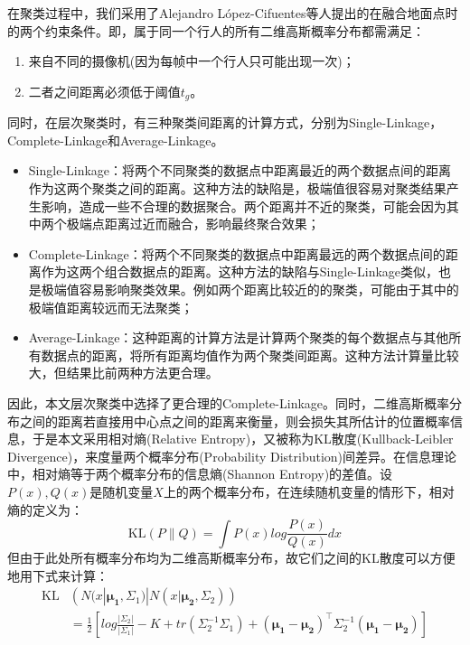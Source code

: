 在聚类过程中，我们采用了Alejandro López-Cifuentes\cite{A2018Semantic}等人提出的在融合地面点时的两个约束条件。即，属于同一个行人的所有二维高斯概率分布都需满足：
\begin{enumerate}
    \item 来自不同的摄像机(因为每帧中一个行人只可能出现一次)；
    \item 二者之间距离必须低于阈值$t_{g}$。
\end{enumerate}
同时，在层次聚类时，有三种聚类间距离的计算方式，分别为Single-Linkage，Complete-Linkage和Average-Linkage。
\begin{itemize}
    \item Single-Linkage：将两个不同聚类的数据点中距离最近的两个数据点间的距离作为这两个聚类之间的距离。这种方法的缺陷是，极端值很容易对聚类结果产生影响，造成一些不合理的数据聚合。两个距离并不近的聚类，可能会因为其中两个极端点距离过近而融合，影响最终聚合效果；
    \item Complete-Linkage：将两个不同聚类的数据点中距离最远的两个数据点间的距离作为这两个组合数据点的距离。这种方法的缺陷与Single-Linkage类似，也是极端值容易影响聚类效果。例如两个距离比较近的的聚类，可能由于其中的极端值距离较远而无法聚类；
    \item Average-Linkage：这种距离的计算方法是计算两个聚类的每个数据点与其他所有数据点的距离，将所有距离均值作为两个聚类间距离。这种方法计算量比较大，但结果比前两种方法更合理。
\end{itemize}
因此，本文层次聚类中选择了更合理的Complete-Linkage。同时，二维高斯概率分布之间的距离若直接用中心点之间的距离来衡量，则会损失其所估计的位置概率信息，于是本文采用相对熵(Relative Entropy)，又被称为KL散度(Kullback-Leibler Divergence)，来度量两个概率分布(Probability Distribution)间差异。在信息理论中，相对熵等于两个概率分布的信息熵(Shannon Entropy)的差值。设$P(x), Q(x)$是随机变量$X$上的两个概率分布，在连续随机变量的情形下，相对熵的定义为：
\begin{equation}
  \text{KL}(P\|Q)=\int P(x)log{\frac{P(x)}{Q(x)}}dx
\end{equation}
但由于此处所有概率分布均为二维高斯概率分布，故它们之间的KL散度可以方便地用下式来计算：
\begin{equation}
  \begin{aligned}
  \text{KL}&\left(N(x|\bm{\mu_1},\Sigma_1)|N(x|\bm{\mu_2},\Sigma_2)\right) \\
  &=\frac{1}{2}\left[log{\frac{|\Sigma_2|}{|\Sigma_1|}}-K+tr(\Sigma_2^{-1}\Sigma_1)+(\bm{\mu_1}-\bm{\mu_2})^\top\Sigma_2^{-1}(\bm{\mu_1}-\bm{\mu_2})\right]
  \end{aligned}
\end{equation}
